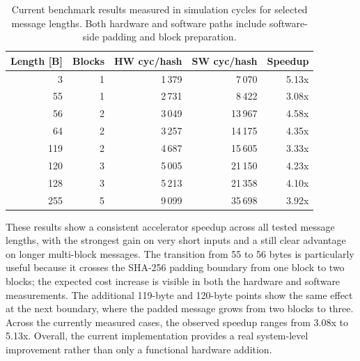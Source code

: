 \documentclass[11pt,a4paper]{article}
\begin{document}
\begin{table}[t]
\centering
\small
\begin{tabularx}{\textwidth}{@{}rrrrr@{}}
\toprule
Length [B] & Blocks & HW cyc/hash & SW cyc/hash & Speedup \\
\midrule
3   & 1 & 1\,379 & 7\,070  & 5.13x \\
55  & 1 & 2\,731 & 8\,422  & 3.08x \\
56  & 2 & 3\,049 & 13\,967 & 4.58x \\
64  & 2 & 3\,257 & 14\,175 & 4.35x \\
119 & 2 & 4\,687 & 15\,605 & 3.33x \\
120 & 3 & 5\,005 & 21\,150 & 4.23x \\
128 & 3 & 5\,213 & 21\,358 & 4.10x \\
255 & 5 & 9\,099 & 35\,698 & 3.92x \\
\bottomrule
\end{tabularx}
\caption{Current benchmark results measured in simulation cycles for selected
message lengths. Both hardware and software paths include software-side padding
and block preparation.}
\label{tab:perf}
\end{table}

These results show a consistent accelerator speedup across all tested message
lengths, with the strongest gain on very short inputs and a still clear
advantage on longer multi-block messages. The transition from 55 to 56 bytes is
particularly useful because it crosses the SHA-256 padding boundary from one
block to two blocks; the expected cost increase is visible in both the hardware
and software measurements. The additional 119-byte and 120-byte points show
the same effect at the next boundary, where the padded message grows from two
blocks to three. Across the currently measured cases, the observed speedup
ranges from 3.08x to 5.13x. Overall, the current implementation provides a real
system-level improvement rather than only a functional hardware addition.
\end{document}
